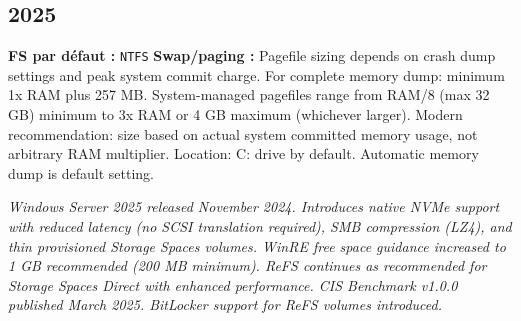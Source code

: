 \documentclass[10pt,a4paper]{article}
\begin{document}
\subsection{2025}
\noindent\small \textbf{FS par d\'efaut :} \texttt{NTFS} \quad\textbullet\quad \textbf{Swap/paging :} Pagefile sizing depends on crash dump settings and peak system commit charge. For complete memory dump: minimum 1x RAM plus 257 MB. System-managed pagefiles range from RAM/8 (max 32 GB) minimum to 3x RAM or 4 GB maximum (whichever larger). Modern recommendation: size based on actual system committed memory usage, not arbitrary RAM multiplier. Location: C: drive by default. Automatic memory dump is default setting.\normalsize\par\smallskip
\noindent\small\textit{Windows Server 2025 released November 2024. Introduces native NVMe support with reduced latency (no SCSI translation required), SMB compression (LZ4), and thin provisioned Storage Spaces volumes. WinRE free space guidance increased to 1 GB recommended (200 MB minimum). ReFS continues as recommended for Storage Spaces Direct with enhanced performance. CIS Benchmark v1.0.0 published March 2025. BitLocker support for ReFS volumes introduced.}\normalsize\par\smallskip
\end{document}
